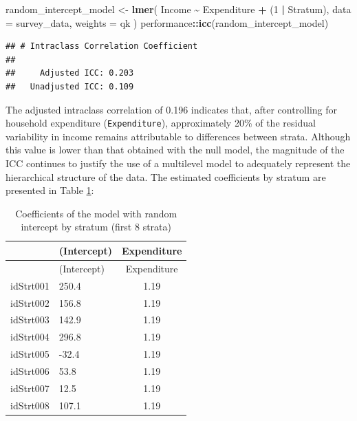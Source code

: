 \documentclass[
  english,
  12pt,
]{book}
\newenvironment{Shaded}{\begin{snugshade}}{\end{snugshade}}
\newcommand{\AttributeTok}[1]{\textcolor[rgb]{0.13,0.29,0.53}{#1}}
\newcommand{\DataTypeTok}[1]{\textcolor[rgb]{0.13,0.29,0.53}{#1}}
\newcommand{\DecValTok}[1]{\textcolor[rgb]{0.00,0.00,0.81}{#1}}
\newcommand{\FunctionTok}[1]{\textcolor[rgb]{0.13,0.29,0.53}{\textbf{#1}}}
\newcommand{\NormalTok}[1]{#1}
\newcommand{\OtherTok}[1]{\textcolor[rgb]{0.56,0.35,0.01}{#1}}
\newcommand{\SpecialCharTok}[1]{\textcolor[rgb]{0.81,0.36,0.00}{\textbf{#1}}}
\begin{document}
\begin{Shaded}
\begin{Highlighting}[]
\NormalTok{random\_intercept\_model }\OtherTok{\textless{}{-}} \FunctionTok{lmer}\NormalTok{(}
\NormalTok{  Income }\SpecialCharTok{\textasciitilde{}}\NormalTok{ Expenditure }\SpecialCharTok{+}\NormalTok{ (}\DecValTok{1} \SpecialCharTok{|}\NormalTok{ Stratum),}
  \AttributeTok{data =}\NormalTok{ survey\_data,}
  \AttributeTok{weights =}\NormalTok{ qk}
\NormalTok{)}
\NormalTok{performance}\SpecialCharTok{::}\FunctionTok{icc}\NormalTok{(random\_intercept\_model)}
\end{Highlighting}
\end{Shaded}

\begin{verbatim}
## # Intraclass Correlation Coefficient
## 
##     Adjusted ICC: 0.203
##   Unadjusted ICC: 0.109
\end{verbatim}

The adjusted intraclass correlation of 0.196 indicates that, after controlling for household expenditure (\texttt{Expenditure}), approximately 20\% of the residual variability in income remains attributable to differences between strata. Although this value is lower than that obtained with the null model, the magnitude of the ICC continues to justify the use of a multilevel model to adequately represent the hierarchical structure of the data. The estimated coefficients by stratum are presented in Table \ref{tab:tab-coef-intercepto-aleatorio}:

\begin{Shaded}
\end{Shaded}

\begin{longtable}[]{@{}llc@{}}
\caption{\label{tab:tab-coef-intercepto-aleatorio}Coefficients of the model with random intercept by stratum (first 8 strata)}\tabularnewline
\toprule\noalign{}
& (Intercept) & Expenditure \\
\midrule\noalign{}
\endfirsthead
\toprule\noalign{}
& (Intercept) & Expenditure \\
\midrule\noalign{}
\endhead
\bottomrule\noalign{}
\endlastfoot
idStrt001 & 250.4 & 1.19 \\
idStrt002 & 156.8 & 1.19 \\
idStrt003 & 142.9 & 1.19 \\
idStrt004 & 296.8 & 1.19 \\
idStrt005 & -32.4 & 1.19 \\
idStrt006 & 53.8 & 1.19 \\
idStrt007 & 12.5 & 1.19 \\
idStrt008 & 107.1 & 1.19 \\
\end{longtable}
\end{document}
